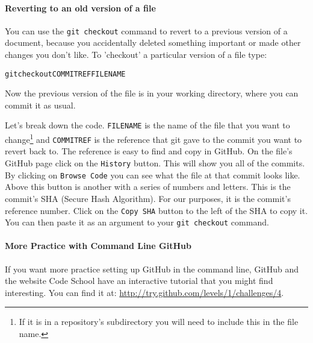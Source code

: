 \documentclass[ChapterTOCs,krantz1]{krantz}\usepackage{graphicx, color}
\makeatletter
\newenvironment{kframe}{%
 \def\at@end@of@kframe{}%
 \ifinner\ifhmode%
  \def\at@end@of@kframe{\end{minipage}}%
  \begin{minipage}{\columnwidth}%
 \fi\fi%
 \def\FrameCommand##1{\hskip\@totalleftmargin \hskip-\fboxsep
 \colorbox{shadecolor}{##1}\hskip-\fboxsep
     \hskip-\linewidth \hskip-\@totalleftmargin \hskip\columnwidth}%
 \MakeFramed {\advance\hsize-\width
   \@totalleftmargin\z@ \linewidth\hsize
   \@setminipage}}%
 {\par\unskip\endMakeFramed%
 \at@end@of@kframe}
\newenvironment{knitrout}{}{} %
\makeatother
\begin{document}
\paragraph{Reverting to an old version of a file}

You can use the {\tt{git checkout}} command to revert to a previous version of a document, because you accidentally deleted something important or made other changes you don't like. To 'checkout' a particular version of a file type:

\begin{knitrout}
\color{fgcolor}\begin{kframe}
\begin{alltt}
git checkout COMMITREF FILENAME
\end{alltt}
\end{kframe}
\end{knitrout}


\noindent Now the previous version of the file is in your working directory, where you can commit it as usual.

Let's break down the code.  {\tt{FILENAME}} is the name of the file that you want to change\footnote{If it is in a repository's subdirectory you will need to include this in the file name.} and {\tt{COMMITREF}} is the reference that git gave to the commit you want to revert back to. The reference is easy to find and copy in GitHub. On the file's GitHub page click on the {\tt{History}} button. This will show you all of the commits. By clicking on {\tt{Browse Code}} you can see what the file at that commit looks like. Above this button is another with a series of numbers and letters. This is the commit's SHA (Secure Hash Algorithm). For our purposes, it is the commit's reference number. Click on the {\tt{Copy SHA}} button to the left of the SHA to copy it. You can then paste it as an argument to your {\tt{git checkout}} command. 

\paragraph{More Practice with Command Line GitHub}

If you want more practice setting up GitHub in the command
line, GitHub and the website Code School have an interactive
tutorial that you might find interesting. You can find it at:
\url{http://try.github.com/levels/1/challenges/4}.
\end{document}
